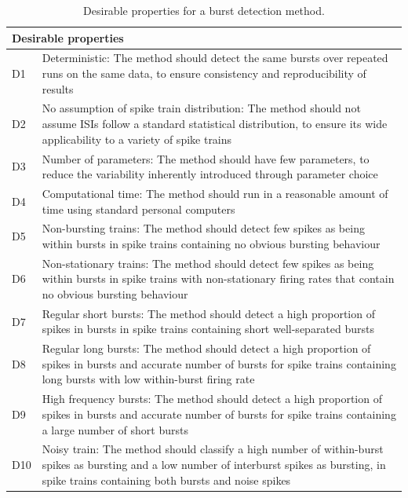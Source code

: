 \documentclass[12pt, titlepage]{article}
\begin{document}
	\begin{table}[h] \centering 	{}
		\begin{tabular}{|l|m{13cm}|}
			\hline \multicolumn{2}{|l|}{Desirable properties}
			\\ \hline
			D1 & Deterministic: The method should detect the same bursts over repeated runs on the same  data, to ensure consistency and reproducibility of results
			\\ D2 & No assumption of spike train distribution: The method should not assume ISIs follow a standard statistical  
			distribution, to ensure its wide applicability to a variety of spike trains
			\\  D3 & Number of parameters: The method should have few parameters, to reduce the variability inherently introduced through parameter choice
			\\D4 & Computational time: The method should run in a reasonable amount of time using standard personal computers
			\\ D5 & Non-bursting trains: The method should detect few spikes as being within bursts in spike trains containing no obvious bursting behaviour
			\\D6 & Non-stationary trains: The method should detect few spikes as being within bursts in spike trains with non-stationary firing rates that contain no obvious bursting behaviour 
			\\ D7 & Regular short bursts: The method should detect a high proportion of spikes in bursts in spike trains containing short well-separated bursts
			\\D8 & Regular long bursts: The method should detect a high proportion of spikes in bursts and accurate  number of bursts for spike trains containing long bursts with low within-burst firing rate
			\\  D9 & High frequency bursts: The method should detect a high proportion of spikes in bursts and accurate number of bursts  for spike trains containing a large number of short bursts
			\\D10 & Noisy train: The method should classify a high number of within-burst spikes as bursting and a low number of interburst spikes as bursting, in spike trains containing both bursts and noise spikes
			\\ \hline
		\end{tabular} \caption{Desirable properties for a burst detection method.}
		\label{des_prop}
	\end{table}
\end{document}
